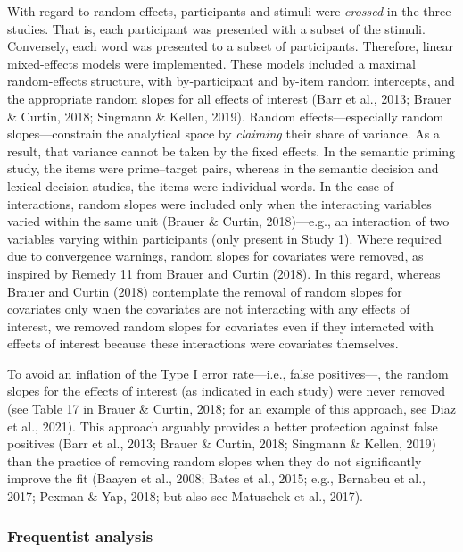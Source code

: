 \documentclass[
  12pt,
  man,floatsintext]{apa7}
\begin{document}
With regard to random effects, participants and stimuli were \emph{crossed} in the three studies. That is, each participant was presented with a subset of the stimuli. Conversely, each word was presented to a subset of participants. Therefore, linear mixed-effects models were implemented. These models included a maximal random-effects structure, with by-participant and by-item random intercepts, and the appropriate random slopes for all effects of interest (Barr et al., 2013; Brauer \& Curtin, 2018; Singmann \& Kellen, 2019). Random effects---especially random slopes---constrain the analytical space by \emph{claiming} their share of variance. As a result, that variance cannot be taken by the fixed effects. In the semantic priming study, the items were prime--target pairs, whereas in the semantic decision and lexical decision studies, the items were individual words. In the case of interactions, random slopes were included only when the interacting variables varied within the same unit (Brauer \& Curtin, 2018)---e.g., an interaction of two variables varying within participants (only present in Study 1). Where required due to convergence warnings, random slopes for covariates were removed, as inspired by Remedy 11 from Brauer and Curtin (2018). In this regard, whereas Brauer and Curtin (2018) contemplate the removal of random slopes for covariates only when the covariates are not interacting with any effects of interest, we removed random slopes for covariates even if they interacted with effects of interest because these interactions were covariates themselves.

To avoid an inflation of the Type I error rate---i.e., false positives---, the random slopes for the effects of interest (as indicated in each study) were never removed (see Table 17 in Brauer \& Curtin, 2018; for an example of this approach, see Diaz et al., 2021). This approach arguably provides a better protection against false positives (Barr et al., 2013; Brauer \& Curtin, 2018; Singmann \& Kellen, 2019) than the practice of removing random slopes when they do not significantly improve the fit (Baayen et al., 2008; Bates et al., 2015; e.g., Bernabeu et al., 2017; Pexman \& Yap, 2018; but also see Matuschek et al., 2017).

\hypertarget{frequentist-analysis}{%
\subsubsection{Frequentist analysis}\label{frequentist-analysis}}
\end{document}
